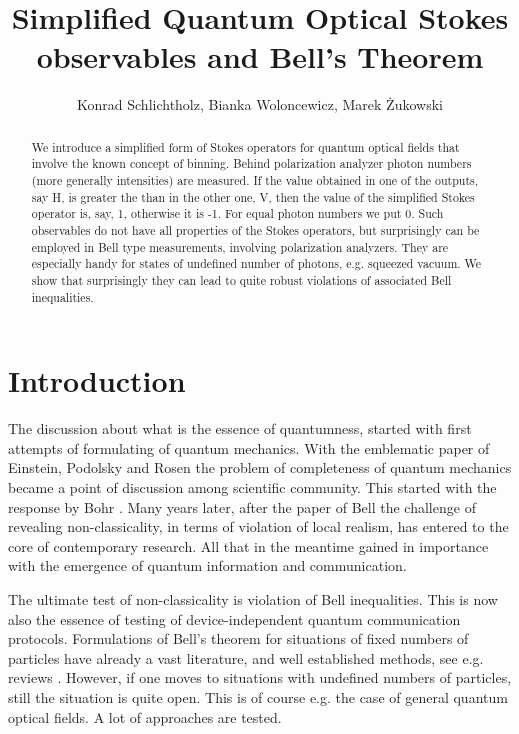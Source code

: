 \documentclass[aps,pra, twocolumn, showpacs]{revtex4-2}
\begin{document}
\title{Simplified Quantum Optical Stokes observables and Bell's Theorem}     
\author{Konrad Schlichtholz, Bianka Woloncewicz, Marek \.Zukowski}
\begin{abstract}



We introduce a simplified form of Stokes operators for quantum optical fields that involve the known concept of binning. 
Behind polarization analyzer photon numbers (more generally intensities) are measured.
If the value obtained in one of the outputs, say H,  is greater the than in the other one, V, then the value of the simplified Stokes operator is, say, 1, otherwise it is -1. For equal photon numbers we put 0. 
Such observables do not have  all properties of the Stokes operators, but surprisingly can be employed  in Bell type measurements, involving polarization analyzers. 
They are especially handy for states of undefined number of photons, e.g. squeezed vacuum. 
We show that surprisingly they can lead to quite robust violations of associated Bell inequalities. 
\end{abstract}
\maketitle



\section{Introduction}

The discussion about what is the essence of quantumness,  started with first attempts of formulating of  quantum mechanics.
With the emblematic paper of Einstein, Podolsky and Rosen \cite{EPR}  the problem of completeness of quantum mechanics became a point of discussion among scientific community. This started with the response by Bohr  \cite{NONCLAS1}.
Many years later, after the paper of Bell \cite{BELL} the challenge of revealing non-classicality, in terms of violation of local realism,  has entered to the core of contemporary research.
All that in the meantime gained in importance with the emergence of quantum information and communication.  

The ultimate test of non-classicality  is violation of Bell inequalities. 
This is now also the essence of testing of device-independent quantum communication protocols.  
Formulations of Bell's theorem for situations of fixed numbers of particles have already a vast literature, and well established methods, see e.g. reviews \cite{Aspect2002,Brukner2012,Pan2012,Werner2001}. 
However, if one moves to situations with undefined numbers of particles, still the situation is quite open. This is of course e.g. the case of general
quantum optical fields. 
A lot of approaches are tested.
\end{document}
